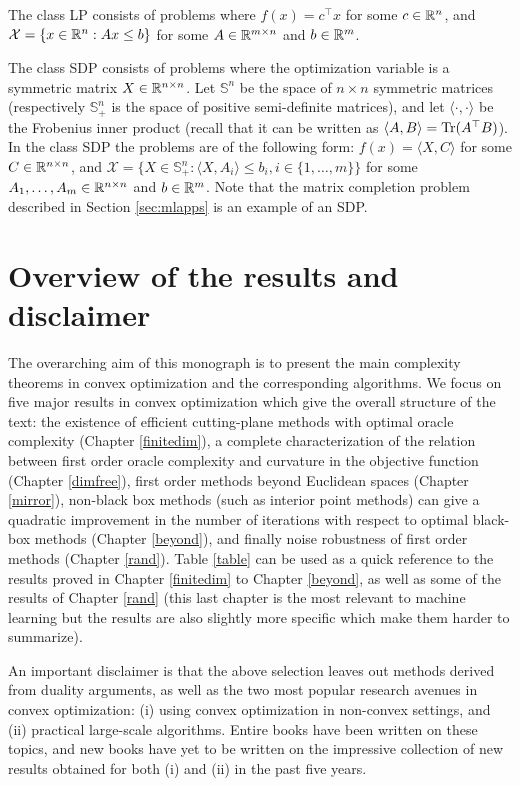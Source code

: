 The class LP consists of problems where $f(x) = c^{\top} x$ for some $c \in \mathbb{R}^n$, and $\mathcal{X} = \{x \in \mathbb{R}^n : A x \leq b \}$ for some $A \in \mathbb{R}^{m \times n}$ and $b \in \mathbb{R}^m$.

The class SDP consists of problems where the optimization variable is a symmetric matrix $X \in \mathbb{R}^{n \times n}$. Let $\mathbb{S}^n$ be the space of $n\times n$ symmetric matrices (respectively $\mathbb{S}^n_+$ is the space of positive semi-definite matrices), and let $\langle \cdot, \cdot \rangle$ be the Frobenius inner product (recall that it can be written as $\langle A, B \rangle = \mathrm{Tr}(A^{\top} B)$). In the class SDP the problems are of the following form: $f(x) = \langle X, C \rangle$ for some $C \in \mathbb{R}^{n \times n}$, and $\mathcal{X} = \{X \in \mathbb{S}^n_+ : \langle X, A_i \rangle \leq b_i, i \in \{1, \hdots, m\} \}$ for some $A_1, \hdots, A_m \in \mathbb{R}^{n \times n}$ and $b \in \mathbb{R}^m$. Note that the matrix completion problem described in Section \ref{sec:mlapps} is an example of an SDP.

\section{Overview of the results and disclaimer}
The overarching aim of this monograph is to present the main complexity theorems in convex optimization and the corresponding algorithms. We focus on five major results in convex optimization which give the overall structure of the text: the existence of efficient cutting-plane methods with optimal oracle complexity (Chapter \ref{finitedim}), a complete characterization of the relation between first order oracle complexity and curvature in the objective function (Chapter \ref{dimfree}), first order methods beyond Euclidean spaces (Chapter \ref{mirror}), non-black box methods (such as interior point methods) can give a quadratic improvement in the number of iterations with respect to optimal black-box methods (Chapter \ref{beyond}), and finally noise robustness of first order methods (Chapter \ref{rand}). Table \ref{table} can be used as a quick reference to the results proved in Chapter \ref{finitedim} to Chapter \ref{beyond}, as well as some of the results of Chapter \ref{rand} (this last chapter is the most relevant to machine learning but the results are also slightly more specific which make them harder to summarize).

An important disclaimer is that the above selection leaves out methods derived from duality arguments, as well as the two most popular research avenues in convex optimization: (i) using convex optimization in non-convex settings, and (ii) practical large-scale algorithms. Entire books have been written on these topics, and new books have yet to be written on the impressive collection of new results obtained for both (i) and (ii) in the past five years. 

